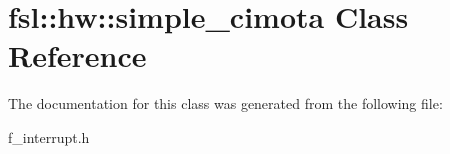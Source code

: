 \hypertarget{classfsl_1_1hw_1_1simple__cimota}{}\section{fsl\+::hw\+::simple\+\_\+cimota Class Reference}
\label{classfsl_1_1hw_1_1simple__cimota}


The documentation for this class was generated from the following file\+:\begin{DoxyCompactItemize}
\item 
f\+\_\+interrupt.\+h\end{DoxyCompactItemize}
